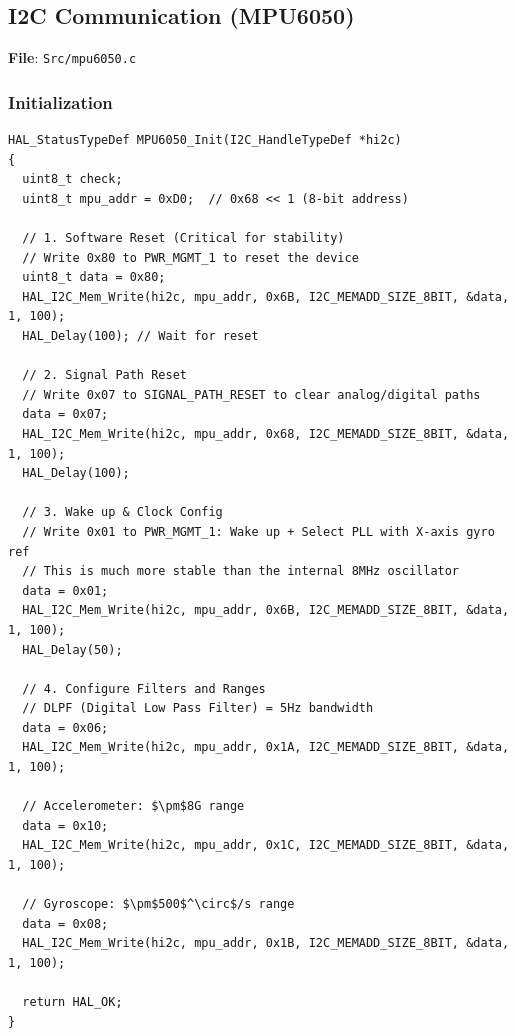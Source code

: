 \documentclass[11pt,a4paper]{article}
\begin{document}
\subsection{I2C Communication (MPU6050)}
\textbf{File}: \texttt{Src/mpu6050.c}

\subsubsection{Initialization}
\begin{lstlisting}[caption=MPU6050 Initialization (Robust), label=lst:mpuinit]
HAL_StatusTypeDef MPU6050_Init(I2C_HandleTypeDef *hi2c)
{
  uint8_t check;
  uint8_t mpu_addr = 0xD0;  // 0x68 << 1 (8-bit address)
  
  // 1. Software Reset (Critical for stability)
  // Write 0x80 to PWR_MGMT_1 to reset the device
  uint8_t data = 0x80;
  HAL_I2C_Mem_Write(hi2c, mpu_addr, 0x6B, I2C_MEMADD_SIZE_8BIT, &data, 1, 100);
  HAL_Delay(100); // Wait for reset
  
  // 2. Signal Path Reset
  // Write 0x07 to SIGNAL_PATH_RESET to clear analog/digital paths
  data = 0x07;
  HAL_I2C_Mem_Write(hi2c, mpu_addr, 0x68, I2C_MEMADD_SIZE_8BIT, &data, 1, 100);
  HAL_Delay(100);
  
  // 3. Wake up & Clock Config
  // Write 0x01 to PWR_MGMT_1: Wake up + Select PLL with X-axis gyro ref
  // This is much more stable than the internal 8MHz oscillator
  data = 0x01;
  HAL_I2C_Mem_Write(hi2c, mpu_addr, 0x6B, I2C_MEMADD_SIZE_8BIT, &data, 1, 100);
  HAL_Delay(50);
  
  // 4. Configure Filters and Ranges
  // DLPF (Digital Low Pass Filter) = 5Hz bandwidth
  data = 0x06;
  HAL_I2C_Mem_Write(hi2c, mpu_addr, 0x1A, I2C_MEMADD_SIZE_8BIT, &data, 1, 100);
  
  // Accelerometer: $\pm$8G range
  data = 0x10;
  HAL_I2C_Mem_Write(hi2c, mpu_addr, 0x1C, I2C_MEMADD_SIZE_8BIT, &data, 1, 100);
  
  // Gyroscope: $\pm$500$^\circ$/s range
  data = 0x08;
  HAL_I2C_Mem_Write(hi2c, mpu_addr, 0x1B, I2C_MEMADD_SIZE_8BIT, &data, 1, 100);
  
  return HAL_OK;
}
\end{lstlisting}
\end{document}
